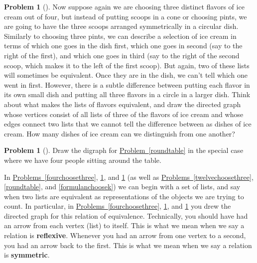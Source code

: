 \documentclass[10pt,]{book}
\newcommand{\terminology}[1]{\textbf{#1}}
\theoremstyle{plain}
\theoremstyle{definition}
\newtheorem{activity}[project]{Problem}
\theoremstyle{definition}
\numberwithin{equation}{chapter}
\newcommand{\importantarrow}{\Rightarrow}
\begin{document}
\begin{activity}[]\marginsymbol[-1em]{\pdftooltip{$\importantarrow$}{especially interesting}} \label{icecreaminadish}
Now suppose again we are choosing three distinct flavors of ice cream out of four, but instead of putting scoops in a cone or choosing pints, we are going to have the three scoops arranged symmetrically in a circular dish. Similarly to choosing three pints, we can describe a selection of ice cream in terms of which one goes in the dish first, which one goes in second (say to the right of the first), and which one goes in third (say to the right of the second scoop, which makes it to the left of the first scoop). But again, two of these lists will sometimes be equivalent. Once they are in the dish, we can't tell which one went in first. However, there is a subtle difference between putting each flavor in its own small dish and putting all three flavors in a circle in a larger dish. Think about what makes the lists of flavors equivalent, and draw the directed graph whose vertices consist of all lists of three of the flavors of ice cream and whose edges connect two lists that we cannot tell the difference between as dishes of ice cream. How many dishes of ice cream can we distinguish from one another?%
\end{activity}
\begin{activity}[]\marginsymbol[-1em]{} \label{roundtablefour}
Draw the digraph for \hyperref[roundtable]{Problem~\ref{roundtable}} in the special case where we have four people sitting around the table.%
\end{activity}
In \hyperref[fourchoosethree]{Problems~\ref{fourchoosethree}}, \hyperref[icecreaminadish]{\ref{icecreaminadish}}, and \hyperref[roundtablefour]{\ref{roundtablefour}} (as well as \hyperref[twelvechoosethree]{Problems~\ref{twelvechoosethree}}, \hyperref[roundtable]{\ref{roundtable}}, and \hyperref[formulanchoosek]{\ref{formulanchoosek}}) we can begin with a set of lists, and say when two lists are equivalent as representations of the objects we are trying to count. In particular, in \hyperref[fourchoosethree]{Problems~\ref{fourchoosethree}}, \hyperref[icecreaminadish]{\ref{icecreaminadish}}, and \hyperref[roundtablefour]{\ref{roundtablefour}} you drew the directed graph for this relation of equivalence. Technically, you should have had an arrow from each vertex (list) to itself. This is what we mean when we say a relation is \terminology{reflexive}. Whenever you had an arrow from one vertex to a second, you had an arrow back to the first. This is what we mean when we say a relation is \terminology{symmetric}.%
\end{document}

